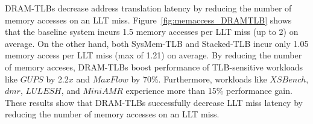 DRAM-TLBs decrease address translation latency by reducing the number
of memory accesses on an LLT miss. Figure~\ref{fig:memaccess_DRAMTLB}
shows that the baseline system incurs 1.5 memory accesses per LLT miss
(up to 2) on average. On the other hand, both SysMem-TLB and
Stacked-TLB incur only 1.05 memory access per LLT miss (max of 1.21)
on average. By reducing the number of memory acceses, DRAM-TLBs boost
performance of TLB-sensitive workloads like $GUPS$ by 2.2$x$ and
$MaxFlow$ by 70\%. Furthermore, workloads like $XSBench$, $dmr$,
$LULESH$, and $MiniAMR$ experience more than 15\% performance gain.
These results show that DRAM-TLBs successfully decrease LLT miss
latency by reducing the number of memory accesses on an LLT miss.

